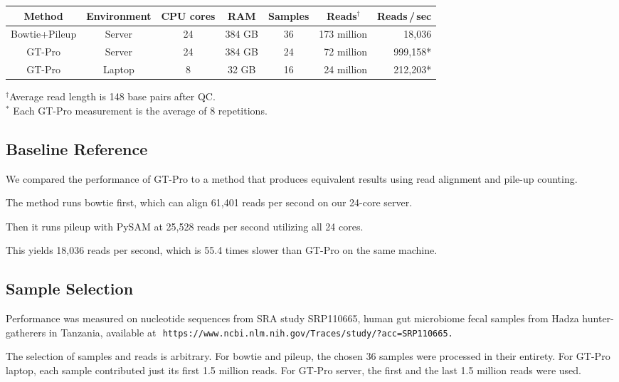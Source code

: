 \documentclass[10pt]{article}
\newcommand\figurebreak{}
\begin{document}
\figurebreak

\renewcommand{\arraystretch}{2.0}
\begin{center}
\footnotesize
\begin{tabular}{|c|c|c|c|c|r|r|}
\hline
Method & Environment & CPU cores & RAM & Samples & \,\,\,\,Reads$^\dagger$\,\,\,\, & Reads\,/\,sec
\\ \hline
Bowtie+Pileup & Server & 24 & 384 GB & 36 & 173 million & 18,036\phantom{*}
\\ \hline
GT-Pro                & Server & 24 & 384 GB & 24 &  72 million & 999,158*
\\ \hline
GT-Pro                & Laptop & 8 & 32 GB & 16 &  24 million & 212,203*
\\ \hline
\end{tabular}

$^\dagger$Average read length is 148 base pairs after QC.\vphantom{\huge y}
\\
\vphantom{\Huge y}$^*$ Each GT-Pro measurement is the average of 8 repetitions.
\end{center}
\figurebreak



\subsection{Baseline Reference}


We compared the performance of GT-Pro to a method that produces equivalent results using read alignment and pile-up counting.

The method runs bowtie first, which can align 61,401 reads per second on our 24-core server.

Then it runs pileup with PySAM at 25,528 reads per second utilizing all 24 cores.

This yields 18,036 reads per second, which is 55.4 times slower than GT-Pro on the same machine.

\subsection{Sample Selection}


Performance was measured on nucleotide sequences from SRA study SRP110665, human gut microbiome fecal samples from Hadza hunter-gatherers in Tanzania, available at \,\,\texttt{https://www.ncbi.nlm.nih.gov/Traces/study/?acc=SRP110665.}

The selection of samples and reads is arbitrary.  For bowtie and pileup, the chosen 36 samples were processed in their entirety.  For GT-Pro laptop, each sample contributed just its first 1.5 million reads.  For GT-Pro server, the first and the last 1.5 million reads were used.
\end{document}
